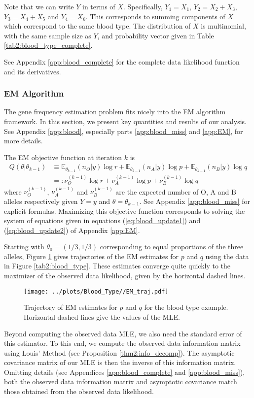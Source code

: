 \documentclass[11pt, oneside]{article}   	%
\newcommand{\bE}{\mathbb{E}}
\begin{document}
Note that we can write $Y$ in terms of $X$. Specifically, $Y_1 = X_1$, $Y_2 = X_2 + X_3$, $Y_3 = X_4 + X_5$ and $Y_4 = X_6$. This corresponds to summing components of $X$ which correspond to the same blood type. The distribution of $X$ is multinomial, with the same sample size as $Y$, and probability vector given in Table \ref{tab2:blood_type_complete}.

See Appendix \ref{app:blood_complete} for the complete data likelihood function and its derivatives.

\subsubsection{EM Algorithm}

The gene frequency estimation problem fits nicely into the EM algorithm framework. In this section, we present key quantities and results of our analysis. See Appendix \ref{app:blood}, especially parts \ref{app:blood_miss} and \ref{app:EM}, for more details.

The EM objective function at iteration $k$ is
%
\begin{align}
    Q(\theta|\theta_{k-1}) &\equiv  \bE_{\theta_{k-1}}(n_O | y) \log r + \bE_{\theta_{k-1}}(n_A | y) \log p + \bE_{\theta_{k-1}}(n_B | y) \log q\\
    &=: \nu^{(k-1)}_O \log r + \nu^{(k-1)}_A \log p + \nu^{(k-1)}_B \log q
\end{align}
%
where $\nu^{(k-1)}_O$, $\nu^{(k-1)}_A$ and $\nu^{(k-1)}_B$ are the expected number of O, A and B alleles respectively given $Y=y$ and $\theta = \theta_{k-1}$. See Appendix \ref{app:blood_miss} for explicit formulas. Maximizing this objective function corresponds to solving the system of equations given in equations (\ref{eq:blood_update1}) and (\ref{eq:blood_update2}) of Appendix \ref{app:EM}.

Starting with $\theta_0 = (1/3, 1/3)$ corresponding to equal proportions of the three alleles, Figure \ref{fig:blood_EM_traj} gives trajectories of the EM estimates for $p$ and $q$ using the data in Figure \ref{tab2:blood_type}. These estimates converge quite quickly to the maximizer of the observed data likelihood, given by the horizontal dashed lines.
%
\begin{figure}
    \centering
    \caption{Trajectory of EM estimates for $p$ and $q$ for the blood type example. Horizontal dashed lines give the values of the MLE.}
    \label{fig:blood_EM_traj}
    \texttt{[image: ../plots/Blood\_Type//EM\_traj.pdf]}
\end{figure}
%
Beyond computing the observed data MLE, we also need the standard error of this estimator. To this end, we compute the observed data information matrix using Louis' Method (see Proposition \ref{thm2:info_decomp}). The asymptotic covariance matrix of our MLE is then the inverse of this information matrix. Omitting details (see Appendices \ref{app:blood_complete} and \ref{app:blood_miss}), both the observed data information matrix and asymptotic covariance match those obtained from the observed data likelihood. 
%
\end{document}

